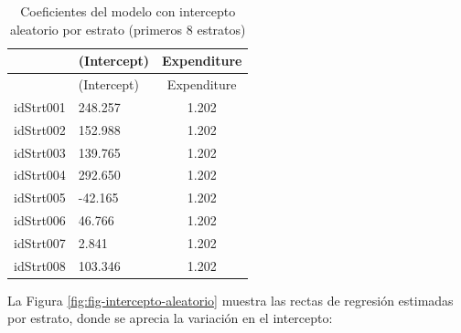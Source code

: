 \documentclass[
  spanish,
  12pt,
]{book}
\newenvironment{Shaded}{\begin{snugshade}}{\end{snugshade}}
\newcommand{\AttributeTok}[1]{\textcolor[rgb]{0.13,0.29,0.53}{#1}}
\newcommand{\FunctionTok}[1]{\textcolor[rgb]{0.13,0.29,0.53}{\textbf{#1}}}
\newcommand{\NormalTok}[1]{#1}
\newcommand{\OtherTok}[1]{\textcolor[rgb]{0.56,0.35,0.01}{#1}}
\newcommand{\SpecialCharTok}[1]{\textcolor[rgb]{0.81,0.36,0.00}{\textbf{#1}}}
\newcommand{\StringTok}[1]{\textcolor[rgb]{0.31,0.60,0.02}{#1}}
\begin{document}
\begin{longtable}[]{@{}llc@{}}
\caption{\label{tab:tab-coef-intercepto-aleatorio}Coeficientes del modelo con intercepto aleatorio por estrato (primeros 8 estratos)}\tabularnewline
\toprule\noalign{}
& (Intercept) & Expenditure \\
\midrule\noalign{}
\endfirsthead
\toprule\noalign{}
& (Intercept) & Expenditure \\
\midrule\noalign{}
\endhead
\bottomrule\noalign{}
\endlastfoot
idStrt001 & 248.257 & 1.202 \\
idStrt002 & 152.988 & 1.202 \\
idStrt003 & 139.765 & 1.202 \\
idStrt004 & 292.650 & 1.202 \\
idStrt005 & -42.165 & 1.202 \\
idStrt006 & 46.766 & 1.202 \\
idStrt007 & 2.841 & 1.202 \\
idStrt008 & 103.346 & 1.202 \\
\end{longtable}

La Figura \ref{fig:fig-intercepto-aleatorio} muestra las rectas de regresión estimadas por estrato, donde se aprecia la variación en el intercepto:

\begin{Shaded}
\end{Shaded}
\end{document}
